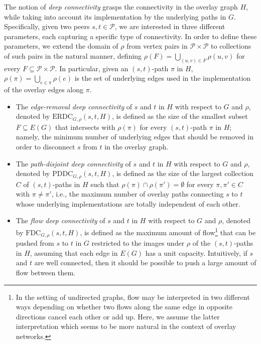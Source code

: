 \LongVersion \documentclass[11pt]{article}
\theoremstyle{definition}
\theoremstyle{plain}
\newcommand{\Edges}[0]{\mathit{E}}
\newcommand{\Peers}[0]{\mathcal{P}}
\newcommand{\ERDC}[0]{\mathrm{ERDC}}
\newcommand{\PDDC}[0]{\mathrm{PDDC}}
\newcommand{\FDC}[0]{\mathrm{FDC}}
\begin{document}
The notion of \emph{deep connectivity} grasps the
connectivity in the overlay graph $H$, while taking into account its
implementation by the underlying paths in $G$.
Specifically, given two peers $s, t \in \Peers$, we are interested in three
different parameters, each capturing a specific type of connectivity.
In order to define these parameters, we extend the domain of $\rho$ from
vertex pairs in $\Peers \times \Peers$ to collections of such pairs in the
natural manner, defining $\rho(F) = \bigcup_{(u, v) \in F} \rho(u, v)$ for
every $F \subseteq \Peers \times \Peers$.
In particular, given an $(s, t)$-path $\pi$ in $H$, $\rho(\pi) = \bigcup_{e
\in \pi} \rho(e)$ is the set of underlying edges used in the implementation of
the overlay edges along $\pi$.
\begin{itemize}

\item
The \emph{edge-removal deep connectivity} of $s$ and $t$ in $H$ with respect
to $G$ and $\rho$, denoted by $\ERDC_{G, \rho}(s, t, H)$, is defined as the size
of the smallest subset $F \subseteq \Edges(G)$ that intersects with
$\rho(\pi)$ for every $(s, t)$-path $\pi$ in $H$;
namely, the minimum number of underlying edges that should be removed in order
to disconnect $s$ from $t$ in the overlay graph.

\item
The \emph{path-disjoint deep connectivity} of $s$ and $t$ in $H$ with
respect to $G$ and $\rho$, denoted by $\PDDC_{G, \rho}(s, t, H)$, is defined as
the size of the largest collection $C$ of $(s, t)$-paths in $H$ such that
$\rho(\pi) \cap \rho(\pi') = \emptyset$ for every $\pi, \pi' \in C$ with $\pi
\neq \pi'$, i.e., the maximum number of overlay paths connecting $s$ to $t$
whose underlying implementations are totally independent of each other.

\item
The \emph{flow deep connectivity} of $s$ and $t$ in $H$ with respect to $G$
and $\rho$, denoted by $\FDC_{G, \rho}(s, t, H)$, is defined as the maximum
amount of flow\footnote{
In the setting of undirected graphs, flow may be interpreted in two different
ways depending on whether two flows along the same edge in opposite directions
cancel each other or add up.
Here, we assume the latter interpretation which seems to be more natural in
the context of overlay networks.
} that can be pushed from $s$ to $t$ in $G$ restricted to the
images under $\rho$ of the $(s, t)$-paths in $H$, assuming that each edge in
$\Edges(G)$ has a unit capacity.
Intuitively, if $s$ and $t$ are well connected, then it should be possible to
push a large amount of flow between them.

\end{itemize}
\end{document}
